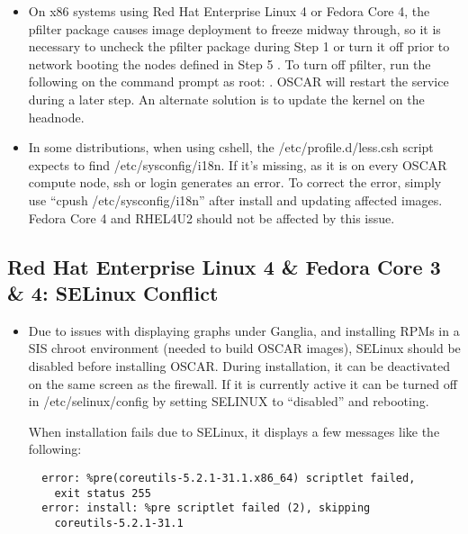 \begin{itemize}
\item On x86 systems using Red Hat Enterprise Linux 4 or Fedora Core 4,
  the pfilter package causes image deployment to freeze midway through,
  so it is necessary to uncheck the pfilter package during Step 1 
   or turn it off prior to 
  network booting the nodes defined in Step 5 .
  To turn off pfilter, run the following on the command prompt as root:
  .  OSCAR will restart the service during
  a later step.  An alternate solution is to update the kernel on the headnode.

\item In some distributions, when using cshell, the 
  /etc/profile.d/less.csh script expects to find /etc/sysconfig/i18n. If 
  it's missing, as it is on every OSCAR compute node, ssh or login
  generates an error.  To correct the error, simply use 
  ``cpush /etc/sysconfig/i18n'' after install and updating affected images.
  Fedora Core 4 and RHEL4U2 should not be affected by this issue.

\end{itemize}


\subsection{Red Hat Enterprise Linux 4 \& Fedora Core 3 \& 4: SELinux Conflict }
\label{subsec:SELinuxnotes}

\begin{itemize}

\item Due to issues with displaying graphs under Ganglia, and installing
  RPMs in a SIS chroot environment (needed to build OSCAR images), SELinux 
  should be disabled before installing OSCAR.  During installation, it can be
  deactivated on the same screen as the firewall.  If it is currently
  active it can be turned off in /etc/selinux/config by setting SELINUX 
  to ``disabled'' and rebooting.

  When installation fails due to SELinux, it displays a few messages like the following:
  \begin{verbatim}
  error: %pre(coreutils-5.2.1-31.1.x86_64) scriptlet failed, 
    exit status 255
  error: install: %pre scriptlet failed (2), skipping 
    coreutils-5.2.1-31.1
  \end{verbatim}
\end{itemize}


